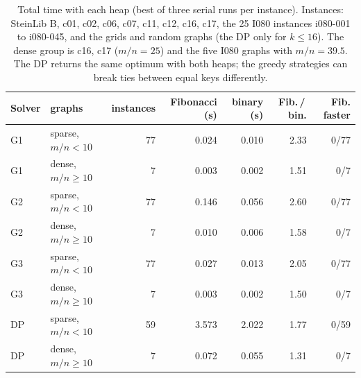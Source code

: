 \begin{table}[!htbp]\centering\small
\begin{tabular}{@{}llrrrrr@{}}\toprule
Solver & graphs & instances & Fibonacci (s) & binary (s) & Fib.\,/\,bin. & Fib. faster\\\midrule
G1 & sparse, \(m/n<10\) & 77 & 0.024 & 0.010 & 2.33 & 0/77\\
G1 & dense, \(m/n\ge10\) & 7 & 0.003 & 0.002 & 1.51 & 0/7\\
G2 & sparse, \(m/n<10\) & 77 & 0.146 & 0.056 & 2.60 & 0/77\\
G2 & dense, \(m/n\ge10\) & 7 & 0.010 & 0.006 & 1.58 & 0/7\\
G3 & sparse, \(m/n<10\) & 77 & 0.027 & 0.013 & 2.05 & 0/77\\
G3 & dense, \(m/n\ge10\) & 7 & 0.003 & 0.002 & 1.50 & 0/7\\
DP & sparse, \(m/n<10\) & 59 & 3.573 & 2.022 & 1.77 & 0/59\\
DP & dense, \(m/n\ge10\) & 7 & 0.072 & 0.055 & 1.31 & 0/7\\
\bottomrule\end{tabular}
\caption{Total time with each heap (best of three serial runs per instance). Instances: SteinLib B, c01, c02, c06, c07, c11, c12, c16, c17, the 25 I080 instances i080-001 to i080-045, and the grids and random graphs (the DP only for \(k\le16\)). The dense group is c16, c17 (\(m/n=25\)) and the five I080 graphs with \(m/n=39.5\). The DP returns the same optimum with both heaps; the greedy strategies can break ties between equal keys differently.}\label{tab:ablation}
\end{table}
